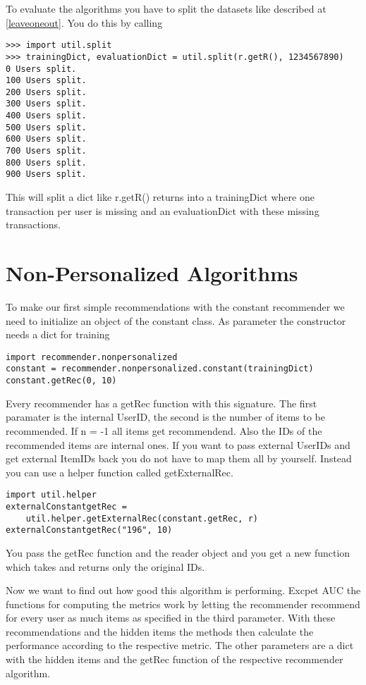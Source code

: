 To evaluate the algorithms you have to split the datasets like described at \ref{leaveoneout}.
You do this by calling
\begin{lstlisting}
>>> import util.split
>>> trainingDict, evaluationDict = util.split(r.getR(), 1234567890)
0 Users split.
100 Users split.
200 Users split.
300 Users split.
400 Users split.
500 Users split.
600 Users split.
700 Users split.
800 Users split.
900 Users split.
\end{lstlisting}
This will split a dict like r.getR() returns into a trainingDict where one transaction
per user is missing and an evaluationDict with these missing transactions.


\section{Non-Personalized Algorithms}
To make our first simple recommendations with the constant recommender
we need to initialize an object of the constant class.
As parameter the constructor needs a dict for training
\begin{lstlisting}
import recommender.nonpersonalized
constant = recommender.nonpersonalized.constant(trainingDict)
constant.getRec(0, 10)
\end{lstlisting}
Every recommender has a getRec function with this signature. The first paramater is the internal
UserID, the second is the number of items to be recommended. If n = -1 all items get recommendend.
Also the IDs of the recommended items are internal ones.
If you want to pass external UserIDs and get external ItemIDs back you do not have
to map them all by yourself. Instead you can use a helper function called
getExternalRec.
\begin{lstlisting}
import util.helper
externalConstantgetRec = 
    util.helper.getExternalRec(constant.getRec, r)
externalConstantgetRec("196", 10)
\end{lstlisting}
You pass the getRec function and the reader object and you get a new function
which takes and returns only the original IDs.

Now we want to find out how good this algorithm is performing.
Excpet AUC the functions for computing the metrics work by letting the recommender recommend
for every user as much items as specified in the third parameter.
With these recommendations and the hidden items the methods then calculate the
performance according to the respective metric.
The other parameters are a dict with the hidden items and the getRec function of the 
respective recommender algorithm.

